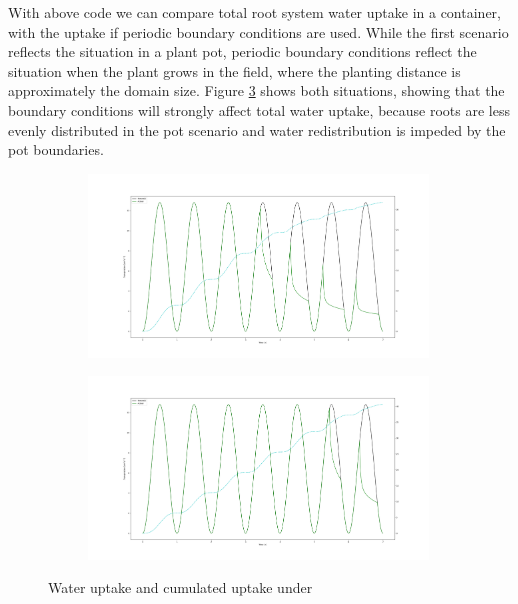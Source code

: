 With above code we can compare total root system water uptake in a container, with the uptake if periodic boundary conditions are used. While the first scenario reflects the situation in a plant pot, periodic boundary conditions reflect the situation when the plant grows in the field, where the planting distance is approximately the domain size. Figure \ref{fig:uptake} shows both situations, showing that the boundary conditions will strongly affect total water uptake, because roots are less evenly distributed in the pot scenario and water redistribution is impeded by the pot boundaries.

\begin{figure}
\begin{subfigure}[c]{0.5\textwidth} 
\includegraphics[width=0.99\textwidth]{Figure6c.png}
 \label{fig:uptake_confined}
\end{subfigure}
\begin{subfigure}[c]{0.5\textwidth}
\includegraphics[width=0.99\textwidth]{Figure6c_periodic.png}
 \label{fig:uptake_peridodic}
\end{subfigure}
\caption{Water uptake and cumulated uptake under} \label{fig:uptake}
\end{figure}



